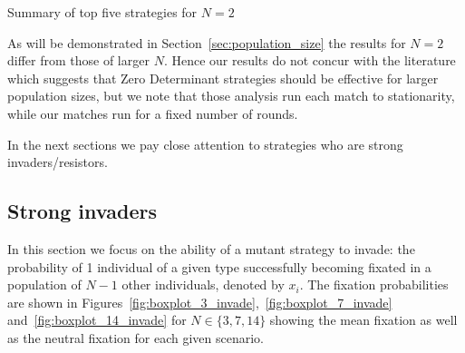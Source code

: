 \documentclass{article}
\begin{document}
\begin{table}[!hbtp]
    \centering
    
    \caption{Summary of top five strategies for \(N=2\)}
    \label{tbl:summary_top_2}
\end{table}

As will be demonstrated in Section~\ref{sec:population_size} the results for
\(N=2\) differ from those of larger $N$. Hence our results do not concur with
the literature which suggests that Zero Determinant strategies should be
effective for larger population sizes, but we note that those analysis run each
match to stationarity, while our matches run for a fixed number of rounds.

In the next sections we pay close attention to
strategies who are strong invaders/resistors.

\subsection{Strong invaders}\label{sec:strong_invaders}

In this section we focus on the ability of a mutant strategy to invade: the
probability of 1 individual of a given type successfully becoming fixated in a
population of \(N - 1\) other individuals, denoted by \(x_i\). The fixation
probabilities are shown in
Figures~\ref{fig:boxplot_3_invade},~\ref{fig:boxplot_7_invade}
and~\ref{fig:boxplot_14_invade} for \(N\in\{3, 7, 14\}\) showing the mean
fixation as well as the neutral fixation for each given scenario.
\end{document}

